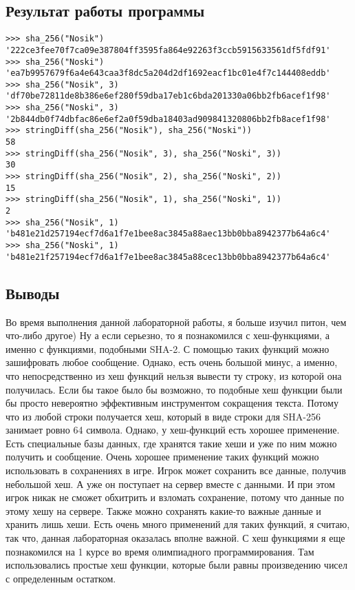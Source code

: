 \documentclass[12pt]{article}
\begin{document}
\subsection*{Результат работы программы}
\begin{lstlisting}
>>> sha_256("Nosik")
'222ce3fee70f7ca09e387804ff3595fa864e92263f3ccb5915633561df5fdf91'
>>> sha_256("Noski")
'ea7b9957679f6a4e643caa3f8dc5a204d2df1692eacf1bc01e4f7c144408eddb'
>>> sha_256("Nosik", 3)
'df70be72811de8b386e6ef280f59dba17eb1c6bda201330a06bb2fb6acef1f98'
>>> sha_256("Noski", 3)
'2b844db0f74dbfac86e6ef2a0f59dba18403ad909841320806bb2fb8acef1f98'
>>> stringDiff(sha_256("Nosik"), sha_256("Noski"))
58
>>> stringDiff(sha_256("Nosik", 3), sha_256("Noski", 3))
30
>>> stringDiff(sha_256("Nosik", 2), sha_256("Noski", 2))
15
>>> stringDiff(sha_256("Nosik", 1), sha_256("Noski", 1))
2
>>> sha_256("Nosik", 1)
'b481e21d257194ecf7d6a1f7e1bee8ac3845a88aec13bb0bba8942377b64a6c4'
>>> sha_256("Noski", 1)
'b481e21f257194ecf7d6a1f7e1bee8ac3845a88cec13bb0bba8942377b64a6c4'
\end{lstlisting}

\subsection*{Выводы}
Во время выполнения данной лабораторной работы, я больше изучил питон, чем что-либо другое) Ну а если серьезно, то я познакомился с хеш-функциями, а именно с функциями, подобными SHA-2. С помощью таких функций можно зашифровать любое сообщение. Однако, есть очень большой минус, а именно, что непосредственно из хеш функций нельзя вывести ту строку, из которой она получилась. Если бы такое было бы возможно, то подобные хеш функции были бы просто невероятно эффективным инструментом сокращения текста. Потому что из любой строки получается хеш, который в виде строки для SHA-256 занимает ровно 64 символа. Однако, у хеш-функций есть хорошее применение. Есть специальные базы данных, где хранятся такие хеши и уже по ним можно получить и сообщение. Очень хорошее применение таких функций можно использовать в сохранениях в игре. Игрок может сохранить все данные, получив небольшой хеш. А уже он поступает на сервер вместе с данными. И при этом игрок никак не сможет обхитрить и взломать сохранение, потому что данные по этому хешу на сервере. Также можно сохранять какие-то важные данные и хранить лишь хеши. Есть очень много применений для таких функций, я считаю, так что, данная лабораторная оказалась вполне важной. С хеш функциями я еще познакомился на 1 курсе во время олимпиадного программирования. Там использовались простые хеш функции, которые были равны произведению чисел с определенным остатком.
\end{document}
